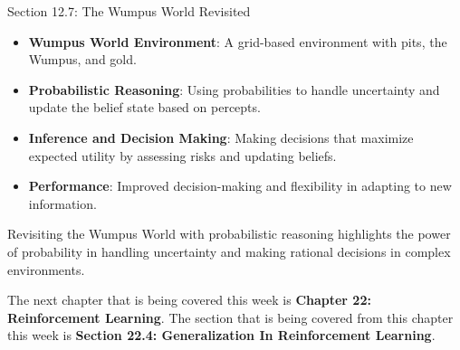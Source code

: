 \begin{notes}{Section 12.7: The Wumpus World Revisited}
\begin{highlight}
        \begin{itemize}
            \item \textbf{Wumpus World Environment}: A grid-based environment with pits, the Wumpus, and gold.
            \item \textbf{Probabilistic Reasoning}: Using probabilities to handle uncertainty and update the belief state based on percepts.
            \item \textbf{Inference and Decision Making}: Making decisions that maximize expected utility by assessing risks and updating beliefs.
            \item \textbf{Performance}: Improved decision-making and flexibility in adapting to new information.
        \end{itemize}
    
        Revisiting the Wumpus World with probabilistic reasoning highlights the power of probability in handling uncertainty and making rational decisions in complex environments.
    
    \end{highlight}
\end{notes}

The next chapter that is being covered this week is \textbf{Chapter 22: Reinforcement Learning}. The section that is being covered from this chapter this week is \textbf{Section 22.4: Generalization In Reinforcement Learning}.

